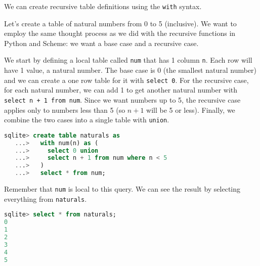 We can create recursive table definitions using the \texttt{with} syntax. 

Let's create a table of natural numbers from 0 to 5 (inclusive). We want to
employ the same thought process as we did with the recursive functions in
Python and Scheme: we want a base case and a recursive case. 

We start by defining a local table called \texttt{num} that has 1 column
\texttt{n}. Each row will have 1 value, a natural number. The base case is 0 
(the smallest natural number) and we can create a one row table for it with
\texttt{select 0}. For the recursive case, for each natural number, we can
add 1 to get another natural number with \texttt{select n + 1 from num}. Since
we want numbers up to 5, the recursive case applies only to numbers less than
5 (so $n + 1$ will be 5 or less). Finally, we combine the two cases into a
single table with \texttt{union}.

\begin{lstlisting}[language=SQL]
sqlite> create table naturals as
   ...>   with num(n) as (
   ...>     select 0 union
   ...>     select n + 1 from num where n < 5
   ...>   )
   ...>   select * from num;
\end{lstlisting}

Remember that \texttt{num} is local to this query. We can see the result by
selecting everything from \texttt{naturals}.
\begin{lstlisting}[language=SQL]
sqlite> select * from naturals;
0
1
2
3
4
5
\end{lstlisting}

